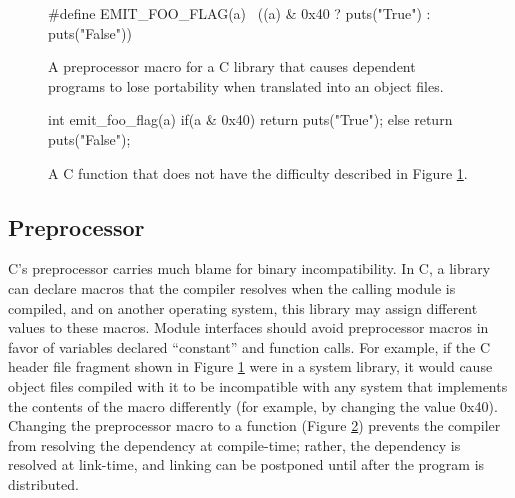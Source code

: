 \begin{figure}[htb]
	\begin{sourcestyle}
		\begin{verbatimtab}[\sourcetabsize]
#define EMIT_FOO_FLAG(a) \
	((a) & 0x40 ? puts("True") : puts("False"))\end{verbatimtab}
	\end{sourcestyle}
	\caption{A preprocessor macro for a C library that causes dependent programs to lose portability when translated into an object files.}
	\label{example_portability_preproc.c}
\end{figure}

\begin{figure}[htb]
	\begin{sourcestyle}
		\begin{verbatimtab}[\sourcetabsize]
int emit_foo_flag(a) {
	if(a & 0x40)
		return puts("True");
	else
		return puts("False");
}\end{verbatimtab}
	\end{sourcestyle}
	\caption{A C function that does not have the difficulty described in Figure \ref{example_portability_preproc.c}.}
	\label{example_portability_preproc.p}
\end{figure}

\subsection{Preprocessor}

C's preprocessor carries much blame for binary incompatibility.  In C, a library can declare macros that
the compiler resolves when the calling module is compiled, and on another operating system, this library may assign
different values to these macros.  Module interfaces should avoid preprocessor macros in favor of variables declared
``constant'' and function calls.  For example, if the C header file fragment shown in Figure
\ref{example_portability_preproc.c} were in a system library, it would cause object files compiled with it to be
incompatible with any system that implements the contents of the macro differently (for example, by changing the value
0x40).  Changing the preprocessor macro to a function (Figure \ref{example_portability_preproc.p}) prevents the
compiler from resolving the dependency at compile-time; rather, the dependency is resolved at link-time, and linking
can be postponed until after the program is distributed.


